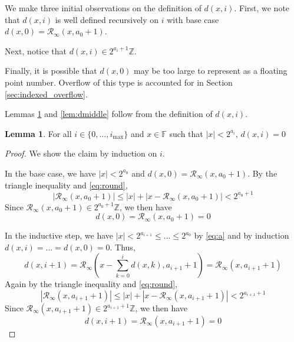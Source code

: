 \documentclass[12pt]{article}
\providecommand{\F}{\ensuremath{\mathbb{F}}}
\providecommand{\Z}{\ensuremath{\mathbb{Z}}}
\providecommand{\max}{\ensuremath{\text{max}}}
\providecommand{\roundtonearestinfty}{\ensuremath{\mathcal{R}_\text{$\infty$}}}
\theoremstyle{definition}
\newtheorem{lem}[thm]{Lemma}
\numberwithin{equation}{section}
\numberwithin{figure}{section}
\begin{document}
    We make three initial observations on the definition of $d(x, i)$. First, we note that $d(x, i)$ is well defined recursively on $i$ with base case $d(x, 0) = \roundtonearestinfty(x, a_0 + 1)$.

    Next, notice that $d(x, i) \in 2^{a_{i} + 1}\Z$.

    Finally, it is possible that $d(x, 0)$ may be too large to represent as a floating point number. Overflow of this type is accounted for in Section \ref{sec:indexed_overflow}.

    Lemmas \ref{lem:dzero} and \ref{lem:dmiddle} follow from the definition of $d(x, i)$.

    \begin{samepage}
    \begin{lem}
      For all $i \in \{0, ..., i_{\max}\}$ and $x \in \F$ such that $|x| < 2^{a_i}$, $d(x, i) = 0$
      \label{lem:dzero}
    \end{lem}
    \end{samepage}

    \begin{proof}
      We show the claim by induction on $i$.

      In the base case, we have $|x| < 2^{a_0}$ and $d(x, 0) = \roundtonearestinfty(x, a_0 + 1)$. By the triangle inequality and  \eqref{eq:round},
      \begin{equation*}
        |\roundtonearestinfty(x, a_0 + 1)| \leq |x| + |x - \roundtonearestinfty(x, a_0 + 1)| < 2^{a_0 + 1}
      \end{equation*}
      Since $\roundtonearestinfty(x, a_0 + 1) \in 2^{a_0 + 1}\Z$, we then have
      \begin{equation*}
        d(x, 0) = \roundtonearestinfty(x, a_0 + 1) = 0
      \end{equation*}

      In the inductive step, we have $|x| < 2^{a_{i + 1}} \leq ... \leq 2^{a_0}$ by  \eqref{eq:a} and by induction $d(x, i)= ... = d(x, 0) = 0$. Thus,
      \begin{equation*}
        d(x, i + 1) = \roundtonearestinfty(x - \sum\limits_{k = 0}^{i}d(x, k), a_{i + 1} + 1) = \roundtonearestinfty(x, a_{i+1} + 1)
      \end{equation*}
      Again by the triangle inequality and  \eqref{eq:round},
      \begin{equation*}
        |\roundtonearestinfty(x, a_{i + 1} + 1)| \leq |x| + |x - \roundtonearestinfty(x, a_{i + 1} + 1)| < 2^{a_{i + 1} + 1}
      \end{equation*}
      Since $\roundtonearestinfty(x, a_{i + 1} + 1) \in 2^{a_{i + 1} + 1}\Z$, we then have
      \begin{equation*}
        d(x, i + 1) = \roundtonearestinfty(x, a_{i + 1} + 1) = 0
      \end{equation*}
    \end{proof}
\end{document}
